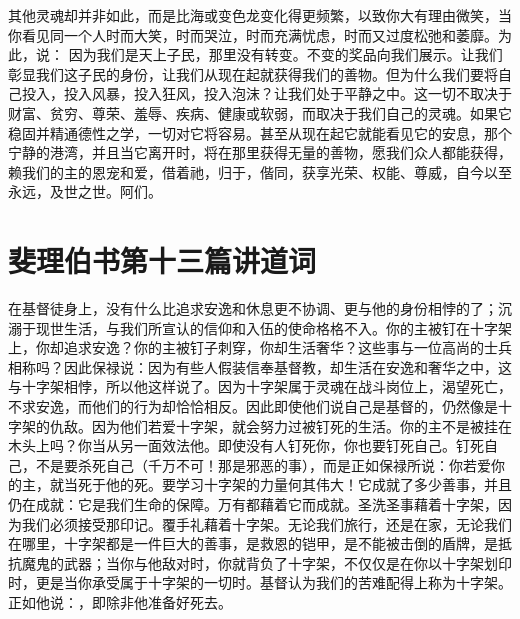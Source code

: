 其他灵魂却并非如此，而是比海或变色龙变化得更频繁，以致你大有理由微笑，当你看见同一个人时而大笑，时而哭泣，时而充满忧虑，时而又过度松弛和萎靡。为此，说： 因为我们是天上子民，那里没有转变。不变的奖品向我们展示。让我们彰显我们这子民的身份，让我们从现在起就获得我们的善物。但为什么我们要将自己投入，投入风暴，投入狂风，投入泡沫？让我们处于平静之中。这一切不取决于财富、贫穷、尊荣、羞辱、疾病、健康或软弱，而取决于我们自己的灵魂。如果它稳固并精通德性之学，一切对它将容易。甚至从现在起它就能看见它的安息，那个宁静的港湾，并且当它离开时，将在那里获得无量的善物，愿我们众人都能获得，赖我们的主的恩宠和爱，借着祂，归于，偕同，获享光荣、权能、尊威，自今以至永远，及世之世。阿们。\par



\section{斐理伯书第十三篇讲道词}

\par

\par

在基督徒身上，没有什么比追求安逸和休息更不协调、更与他的身份相悖的了；沉溺于现世生活，与我们所宣认的信仰和入伍的使命格格不入。你的主被钉在十字架上，你却追求安逸？你的主被钉子刺穿，你却生活奢华？这些事与一位高尚的士兵相称吗？因此保禄说：因为有些人假装信奉基督教，却生活在安逸和奢华之中，这与十字架相悖，所以他这样说了。因为十字架属于灵魂在战斗岗位上，渴望死亡，不求安逸，而他们的行为却恰恰相反。因此即使他们说自己是基督的，仍然像是十字架的仇敌。因为他们若爱十字架，就会努力过被钉死的生活。你的主不是被挂在木头上吗？你当从另一面效法他。即使没有人钉死你，你也要钉死自己。钉死自己，不是要杀死自己（千万不可！那是邪恶的事），而是正如保禄所说：你若爱你的主，就当死于他的死。要学习十字架的力量何其伟大！它成就了多少善事，并且仍在成就：它是我们生命的保障。万有都藉着它而成就。圣洗圣事藉着十字架，因为我们必须接受那印记。覆手礼藉着十字架。无论我们旅行，还是在家，无论我们在哪里，十字架都是一件巨大的善事，是救恩的铠甲，是不能被击倒的盾牌，是抵抗魔鬼的武器；当你与他敌对时，你就背负了十字架，不仅仅是在你以十字架划印时，更是当你承受属于十字架的一切时。基督认为我们的苦难配得上称为十字架。正如他说：，即除非他准备好死去。\par


